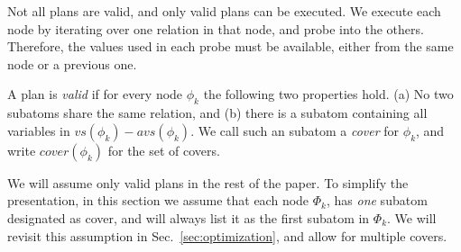 

Not all \FJ plans are valid, and only valid plans can be executed.  We
execute each \FJ node by iterating over one relation in that node, and
probe into the others.  Therefore, the values used in each probe must
be available, either from the same node or a previous one.

\begin{definition}
  A \FJ plan is \emph{valid} if for every node $\phi_k$ the following
  two properties hold.  (a) No two subatoms share the same relation,
  and (b) there is a subatom containing all variables in
  $vs(\phi_k) - avs(\phi_k)$.  We call such an subatom a \emph{cover}
  for $\phi_k$, and write $cover(\phi_k)$ for the set of covers.
\end{definition}

We will assume only valid plans in the rest of the paper.  To simplify
the presentation, in this section we assume that each node $\Phi_k$,
has {\em one} subatom designated as cover, and will always list it as
the first subatom in $\Phi_k$.  We will revisit this assumption in
Sec.~\ref{sec:optimization}, and allow for multiple covers.

